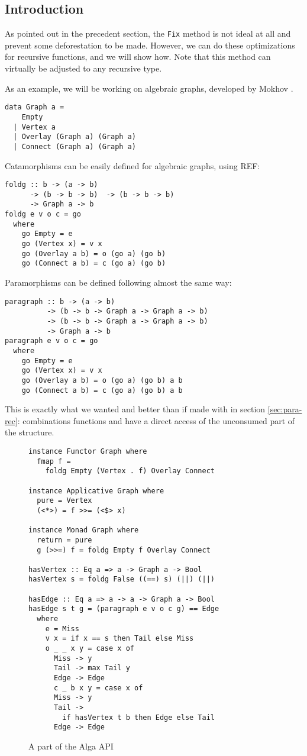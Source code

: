 
\subsection{Introduction}
As pointed out in the precedent section, the \verb|Fix| method is not ideal at all and prevent some deforestation to be made.
However, we can do these optimizations for recursive functions, and we will show how. Note that this method can virtually be adjusted to any recursive type.

As an example, we will be working on algebraic graphs, developed by Mokhov \cite{Mokhov:2017:AGC:3156695.3122956}.
\begin{verbatim}
data Graph a =
    Empty
  | Vertex a
  | Overlay (Graph a) (Graph a)
  | Connect (Graph a) (Graph a)
\end{verbatim}

Catamorphisms can be easily defined for algebraic graphs, using REF:
\begin{verbatim}
foldg :: b -> (a -> b)
      -> (b -> b -> b)  -> (b -> b -> b) 
      -> Graph a -> b
foldg e v o c = go
  where
    go Empty = e
    go (Vertex x) = v x
    go (Overlay a b) = o (go a) (go b)
    go (Connect a b) = c (go a) (go b)
\end{verbatim}

Paramorphisms can be defined following almost the same way:
\begin{verbatim}
paragraph :: b -> (a -> b) 
          -> (b -> b -> Graph a -> Graph a -> b)
          -> (b -> b -> Graph a -> Graph a -> b)
          -> Graph a -> b
paragraph e v o c = go
  where
    go Empty = e
    go (Vertex x) = v x
    go (Overlay a b) = o (go a) (go b) a b
    go (Connect a b) = c (go a) (go b) a b
\end{verbatim}

This is exactly what we wanted and better than if made with  in section \ref{sec:para-rec}: combinations functions  and  have a direct access of the unconsumed part of the structure.

\begin{figure}
\begin{verbatim}
instance Functor Graph where
  fmap f = 
    foldg Empty (Vertex . f) Overlay Connect

instance Applicative Graph where
  pure = Vertex
  (<*>) = f >>= (<$> x)

instance Monad Graph where
  return = pure
  g (>>=) f = foldg Empty f Overlay Connect
  
hasVertex :: Eq a => a -> Graph a -> Bool
hasVertex s = foldg False ((==) s) (||) (||)

hasEdge :: Eq a => a -> a -> Graph a -> Bool
hasEdge s t g = (paragraph e v o c g) == Edge
  where
    e = Miss
    v x = if x == s then Tail else Miss
    o _ _ x y = case x of
      Miss -> y
      Tail -> max Tail y
      Edge -> Edge
      c _ b x y = case x of
      Miss -> y
      Tail -> 
        if hasVertex t b then Edge else Tail
      Edge -> Edge
\end{verbatim}
\caption{A part of the Alga API}
\label{fig:alga}
\end{figure}


